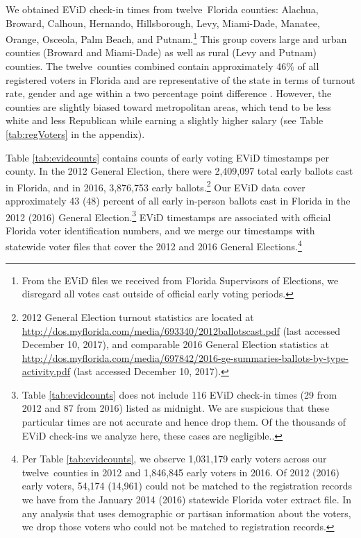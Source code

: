 \documentclass[12pt,titlepage]{article}
\newcommand{\numcounties}{twelve}
\begin{document}
We obtained EViD check-in times from \numcounties\ Florida counties:
Alachua, Broward, Calhoun, Hernando, Hillsborough, Levy, Miami-Dade,
Manatee, Orange, Osceola, Palm Beach, and Putnam.\footnote{From the
  EViD files we received from Florida Supervisors of Elections, we
  disregard all votes cast outside of official early voting periods.}
This group covers large and urban counties (Broward and Miami-Dade) as
well as rural (Levy and Putnam) counties. The \numcounties\ counties
combined contain approximately 46\% of all registered voters in
Florida and are representative of the state in terms of turnout rate,
gender and age within a two percentage point difference .  However,
the counties are slightly biased toward metropolitan areas, which tend
to be less white and less Republican while earning a slightly higher
salary (see Table \ref{tab:regVoters} in the appendix).

Table \ref{tab:evidcounts} contains counts of early voting EViD
timestamps per county. In the 2012 General Election, there were
2,409,097 total early ballots cast in Florida, and in 2016, 3,876,753
early ballots.\footnote{2012 General Election turnout statistics are
  located at
  \url{http://dos.myflorida.com/media/693340/2012ballotscast.pdf}
  (last accessed December 10, 2017), and comparable 2016 General
  Election statistics at
  \url{http://dos.myflorida.com/media/697842/2016-ge-summaries-ballots-by-type-activity.pdf}
  (last accessed December 10, 2017).} Our EViD data cover
approximately 43 (48) percent of all early in-person ballots cast in
Florida in the 2012 (2016) General Election.\footnote{Table
  \ref{tab:evidcounts} does not include 116 EViD check-in times (29
  from 2012 and 87 from 2016) listed as midnight.  We are suspicious
  that these particular times are not accurate and hence drop them. Of
  the thousands of EViD check-ins we analyze here, these cases are
  negligible.\label{fn:midnight}.}  EViD timestamps are associated
with official Florida voter identification numbers, and we merge our
timestamps with statewide voter files that cover the 2012 and 2016
General Elections.\footnote{Per Table \ref{tab:evidcounts}, we observe
  1,031,179 early voters across our \numcounties\ counties in 2012 and
  1,846,845 early voters in 2016. Of 2012 (2016) early voters, 54,174
  (14,961) could not be matched to the registration records we have
  from the January 2014 (2016) statewide Florida voter extract file.
  In any analysis that uses demographic or partisan information about
  the voters, we drop those voters who could not be matched to
  registration records.}
\end{document}
